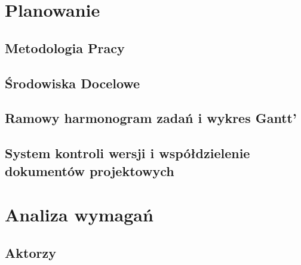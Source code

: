 
\chapter{Planowanie}
\label{ch:planowanie}

\section{Metodologia Pracy}
\label{ch:metodologia-pracy}


\section{Środowiska Docelowe}
\label{sec:srodowiska-docelowe}

\section{Ramowy harmonogram zadań i wykres Gantt’}
\label{sec:ramowy-harmonogram-zadan-i-wykres-gantt’}


\section{ System kontroli wersji i współdzielenie dokumentów projektowych}
\label{sec:-system-kontroli-wersji-i-wspoldzielenie-dokumentow-projektowych}




\chapter{Analiza wymagań}
\label{ch:analiza-wymagan}

\section{Aktorzy}
\label{ch:aktorzy}








